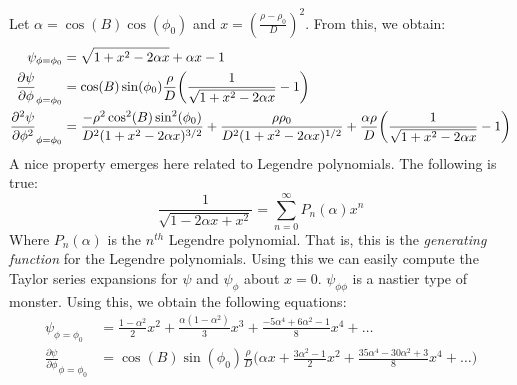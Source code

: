             Let $\alpha=\cos(B)\cos(\phi_{0})$ and
            $x=(\frac{\rho-\rho_{0}}{D})^{2}$.
            From this, we obtain:
            \begin{align*}
                \psi_{\phi=\phi_{0}}
                &=\sqrt{1+x^{2}-2\alpha{x}}+\alpha{x}-1\\
                \frac{\partial\psi}
                     {\partial\phi}_{\phi=\phi_{0}}
                &=\cos(B)\sin(\phi_{0})\frac{\rho}{D}
                \bigg(
                    \frac{1}{\sqrt{1+x^{2}-2\alpha{x}}}-1
                \bigg)\\
                \frac{\partial^{2}\psi}
                     {\partial\phi^{2}}_{\phi=\phi_{0}}
                &=\frac{%
                      -\rho^{2}\cos^{2}(B)\sin^{2}(\phi_{0})
                  }{%
                    D^{2}(1+x^{2}-2\alpha{x})^{3/2}
                  }
                  +\frac{\rho\rho_{0}}
                        {D^{2}(1+x^{2}-2\alpha{x})^{1/2}}
                  +\frac{\alpha\rho}{D}
                  \bigg(\frac{1}{\sqrt{1+x^{2}-2\alpha{x}}}-1\bigg)
            \end{align*}
            A nice property emerges here related to
            Legendre polynomials. The following is true:
            \begin{equation*}
                \frac{1}{\sqrt{1-2\alpha{x}+x^{2}}}
                =\sum_{n=0}^{\infty}P_{n}(\alpha)x^{n}
            \end{equation*}
            Where $P_{n}(\alpha)$ is the $n^{th}$
            Legendre polynomial. That is, this is
            the \textit{generating function} for the
            Legendre polynomials. Using this we can
            easily compute the Taylor series expansions
            for $\psi$ and $\psi_{\phi}$ about $x=0$.
            $\psi_{\phi\phi}$ is a nastier type of monster.
            Using this, we obtain the following equations:
            \begin{align*}
                \psi_{\phi=\phi_{0}}
                &=\frac{1-\alpha^{2}}{2}x^{2}
                 +\frac{\alpha(1-\alpha^{2})}{3}x^{3}
                 +\frac{-5\alpha^{4}+6\alpha^{2}-1}{8}x^{4}+
                 \hdots\\
                  \frac{\partial\psi}
                       {\partial\phi}_{\phi=\phi_{0}}
                &=\cos(B)\sin(\phi_{0})\frac{\rho}{D}
                  \bigg(
                      \alpha{x}+\frac{3\alpha^{2}-1}{2}x^{2}
                      +\frac{35\alpha^{4}-30\alpha^{2}+3}{8}x^{4}
                      +\hdots
                  \bigg)
            \end{align*}
